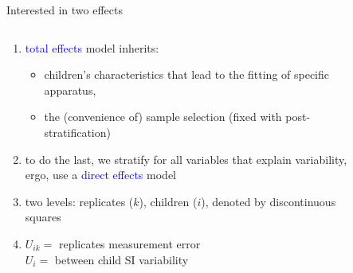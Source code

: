 \begin{frame}
	{Interested in two effects}
	\begin{columns}
		\begin{column}{0.5\textwidth}
			\begin{enumerate}
				\item \textcolor{blue}{total effects} model inherits:
				\begin{itemize}
					\item children’s characteristics that lead to the fitting of specific apparatus,
					\item the (convenience of) sample selection \alert{(fixed with post-stratification)}
				\end{itemize}
				\item to do the last, we stratify for all variables that explain variability, ergo, use a \textcolor{blue}{direct effects} model
				\item two levels: replicates ($k$), children ($i$), denoted by discontinuous squares
				\item $U_{ik}=$ replicates measurement error \\
				$U_{i}=$ between child SI variability \\
			\end{enumerate}
		\end{column}
		\begin{column}{0.5\textwidth}  
			\begin{figure}
\end{figure}
\end{column}
\end{columns}
\end{frame}
